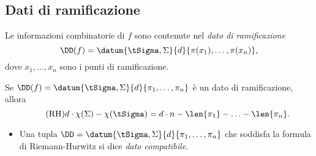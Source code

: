 \subsection{Dati di ramificazione}
\begin{frame}
Le informazioni combinatorie di $f$ sono contenute nel \emph{dato di ramificazione}
\[
\DD(f)=\datum{\tSigma,\Sigma}{d}{\pi(x_1),\ldots,\pi(x_n)},
\]
dove $x_1,\ldots,x_n$ sono i punti di ramificazione.
\begin{mybox}[title=Formula di Riemann-Hurwitz]
Se $\DD(f)=\datum{\tSigma,\Sigma}{d}{\pi_1,\ldots,\pi_n}$ è un dato di ramificazione, allora
\begin{equation}\tag{RH}
d\cdot\chi(\Sigma)-\chi(\tSigma)=d\cdot n-\len{\pi_1}-\ldots-\len{\pi_n}.
\end{equation}
\end{mybox}
\begin{itemize}
\item Una tupla $\DD=\datum{\tSigma,\Sigma}{d}{\pi_1,\ldots,\pi_n}$ che soddisfa la formula di Riemann-Hurwitz si dice \emph{dato compatibile}.
\end{itemize}
\end{frame}

